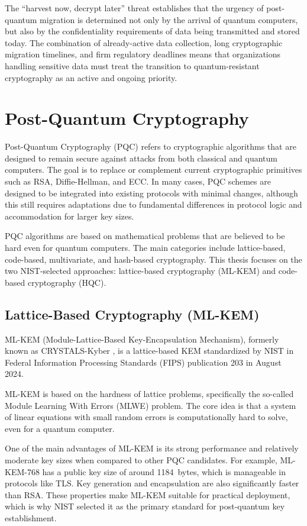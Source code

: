 The ``harvest now, decrypt later'' threat establishes that the urgency of post-quantum migration is determined not only by the arrival of quantum computers, but also by the confidentiality requirements of data being transmitted and stored today. The combination of already-active data collection, long cryptographic migration timelines, and firm regulatory deadlines means that organizations handling sensitive data must treat the transition to quantum-resistant cryptography as an active and ongoing priority.


\section{Post-Quantum Cryptography}
Post-Quantum Cryptography (PQC) refers to cryptographic algorithms that are designed to remain secure against attacks from both classical and quantum computers. The goal is to replace or complement current cryptographic primitives such as RSA, Diffie-Hellman, and ECC. In many cases, PQC schemes are designed to be integrated into existing protocols with minimal changes, although this still requires adaptations due to fundamental differences in protocol logic and accommodation for larger key sizes.

PQC algorithms are based on mathematical problems that are believed to be hard even for quantum computers. The main categories include lattice-based, code-based, multivariate, and hash-based cryptography. This thesis focuses on the two NIST-selected approaches: lattice-based cryptography (ML-KEM) and code-based cryptography (HQC).

\subsection{Lattice-Based Cryptography (ML-KEM)}
ML-KEM (Module-Lattice-Based Key-Encapsulation Mechanism), formerly known as CRYSTALS-Kyber \cite{kyber}, is a lattice-based KEM standardized by NIST in Federal Information Processing Standards (FIPS) publication 203 \cite{mlkem} in August 2024.

ML-KEM is based on the hardness of lattice problems, specifically the so-called Module Learning With Errors (MLWE) problem. The core idea is that a system of linear equations with small random errors is computationally hard to solve, even for a quantum computer.

One of the main advantages of ML-KEM is its strong performance and relatively moderate key sizes when compared to other PQC candidates. For example, ML-KEM-768 has a public key size of around \qty{1184}{bytes}, which is manageable in protocols like TLS. Key generation and encapsulation are also significantly faster than RSA. These properties make ML-KEM suitable for practical deployment, which is why NIST selected it as the primary standard for post-quantum key establishment.

